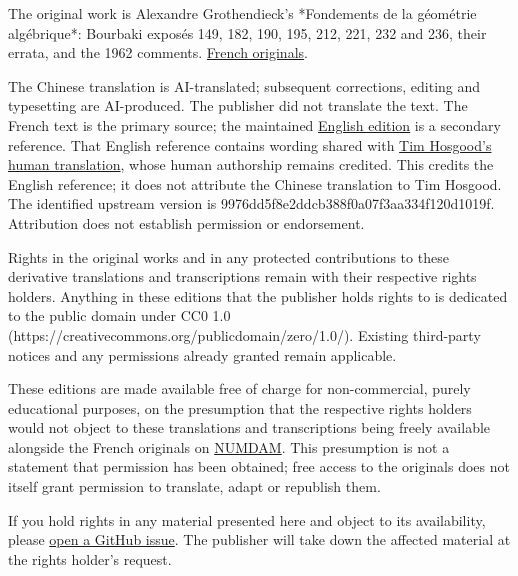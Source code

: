 \begingroup\small
The original work is Alexandre Grothendieck’s *Fondements de la géométrie algébrique*: Bourbaki exposés 149, 182, 190, 195, 212, 221, 232 and 236, their errata, and the 1962 comments. \href{https://www.numdam.org/}{French originals}.

The Chinese translation is AI-translated; subsequent corrections, editing and typesetting are AI-produced. The publisher did not translate the text. The French text is the primary source; the maintained \href{https://github.com/KokunoYumeto/fga-en}{English edition} is a secondary reference. That English reference contains wording shared with \href{https://github.com/thosgood/fga/tree/9976dd5f8e2ddcb388f0a07f3aa334f120d1019f}{Tim Hosgood’s human translation}, whose human authorship remains credited. This credits the English reference; it does not attribute the Chinese translation to Tim Hosgood. The identified upstream version is 9976dd5f8e2ddcb388f0a07f3aa334f120d1019f. Attribution does not establish permission or endorsement.

Rights in the original works and in any protected contributions to these derivative translations and transcriptions remain with their respective rights holders. Anything in these editions that the publisher holds rights to is dedicated to the public domain under CC0 1.0 (https://creativecommons.org/publicdomain/zero/1.0/). Existing third-party notices and any permissions already granted remain applicable.

These editions are made available free of charge for non-commercial, purely educational purposes, on the presumption that the respective rights holders would not object to these translations and transcriptions being freely available alongside the French originals on \href{https://www.numdam.org/journals/PMIHES/}{NUMDAM}. This presumption is not a statement that permission has been obtained; free access to the originals does not itself grant permission to translate, adapt or republish them.

If you hold rights in any material presented here and object to its availability, please \href{https://github.com/KokunoYumeto/fga-zh-hans-cn/issues}{open a GitHub issue}. The publisher will take down the affected material at the rights holder's request.

\par\endgroup\clearpage
